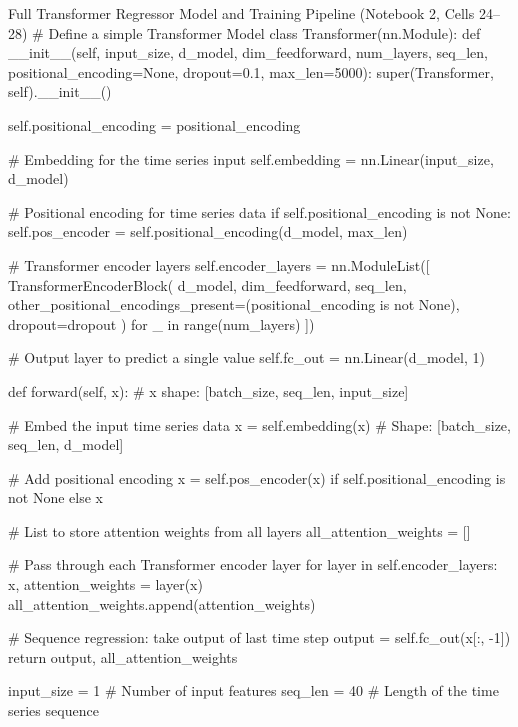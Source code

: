 \documentclass[11pt,a4paper]{article}
\begin{document}
\begin{solutioncode}[label=lst:transformer_regressor]{Full Transformer Regressor Model and Training Pipeline (Notebook 2, Cells 24--28)}
# Define a simple Transformer Model
class Transformer(nn.Module):
    def __init__(self, input_size, d_model, dim_feedforward, num_layers, seq_len, positional_encoding=None, dropout=0.1, max_len=5000):
        super(Transformer, self).__init__()

        self.positional_encoding = positional_encoding

        # Embedding for the time series input
        self.embedding = nn.Linear(input_size, d_model)
        
        # Positional encoding for time series data
        if self.positional_encoding is not None:
            self.pos_encoder = self.positional_encoding(d_model, max_len)
        
        # Transformer encoder layers
        self.encoder_layers = nn.ModuleList([
            TransformerEncoderBlock(
                d_model, 
                dim_feedforward, 
                seq_len, 
                other_positional_encodings_present=(positional_encoding is not None), 
                dropout=dropout
            ) for _ in range(num_layers)
        ])
        
        # Output layer to predict a single value
        self.fc_out = nn.Linear(d_model, 1)

    def forward(self, x):
        # x shape: [batch_size, seq_len, input_size]
        
        # Embed the input time series data
        x = self.embedding(x)  # Shape: [batch_size, seq_len, d_model]    
        
        # Add positional encoding
        x = self.pos_encoder(x) if self.positional_encoding is not None else x
        
        # List to store attention weights from all layers
        all_attention_weights = []

        # Pass through each Transformer encoder layer
        for layer in self.encoder_layers:
            x, attention_weights = layer(x)
            all_attention_weights.append(attention_weights)

        # Sequence regression: take output of last time step
        output = self.fc_out(x[:, -1])
        return output, all_attention_weights

input_size = 1  # Number of input features
seq_len = 40    # Length of the time series sequence


\end{solutioncode}
\end{document}
